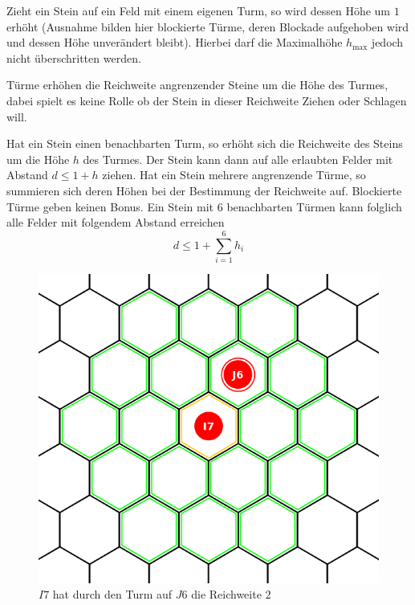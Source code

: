Zieht ein Stein auf ein Feld mit einem eigenen Turm, so wird dessen Höhe um $1$ erhöht (Ausnahme bilden hier blockierte Türme, deren Blockade aufgehoben wird und dessen Höhe unverändert bleibt). Hierbei darf die Maximalhöhe $h_\text{max}$ jedoch nicht überschritten werden.

Türme erhöhen die Reichweite angrenzender Steine um die Höhe des Turmes, dabei spielt es keine Rolle ob der Stein in dieser Reichweite Ziehen oder Schlagen will.

Hat ein Stein einen benachbarten Turm, so erhöht sich die Reichweite des Steins um die Höhe $h$ des Turmes. Der Stein kann dann auf alle erlaubten Felder mit Abstand $d \le 1 + h$ ziehen. Hat ein Stein mehrere angrenzende Türme, so summieren sich deren Höhen bei der Bestimmung der Reichweite auf. Blockierte Türme geben keinen Bonus. Ein Stein mit $6$ benachbarten Türmen kann folglich alle Felder mit folgendem Abstand erreichen \[d \le 1 + \sum_{i=1}^6 h_i\]

\begin{figure}[ht]
\begin{center}
\includegraphics[scale=0.25]{graphic/move-ranged.png}
\end{center}
\caption*{$I7$ hat durch den Turm auf $J6$ die Reichweite $2$}
\end{figure}

